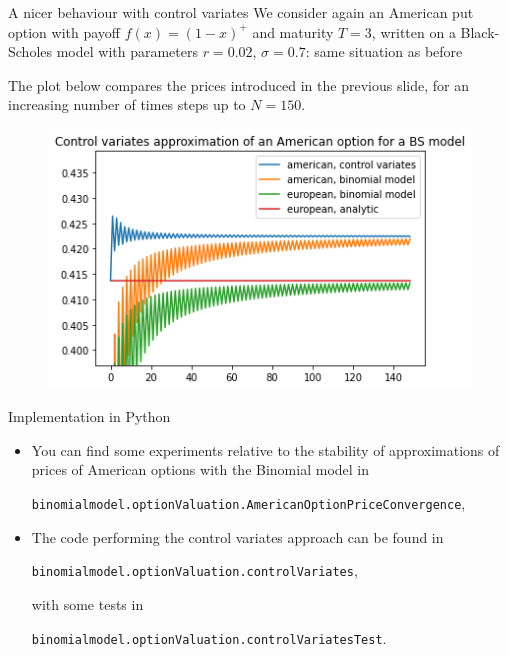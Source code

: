 \documentclass[9 pt]{beamer} %
\begin{document}
\begin{frame}{A nicer behaviour with control variates}
We consider again an American put option with payoff $f(x)=(1-x)^+$ and maturity $T=3$, written on a Black-Scholes model with parameters $r=0.02$, $\sigma=0.7$: same situation as before

The plot below compares the prices introduced in the previous slide, for an increasing number of times steps up to $N=150$.  
 \begin{figure}
\centering
 \includegraphics[scale=0.65]{americancv.png}
\end{figure}
\end{frame}

\begin{frame}{Implementation in Python}
\begin{itemize}
\item You can find some experiments relative to the stability of approximations of prices of American options with the Binomial model in
\begin{center}
\texttt{binomialmodel.optionValuation.AmericanOptionPriceConvergence},
\end{center}
\item The code performing the control variates approach can be found in
\begin{center}
\texttt{binomialmodel.optionValuation.controlVariates},
\end{center}
with some tests in 
\begin{center}
\texttt{binomialmodel.optionValuation.controlVariatesTest}.
\end{center}
\end{itemize}
\end{frame}
\end{document}
